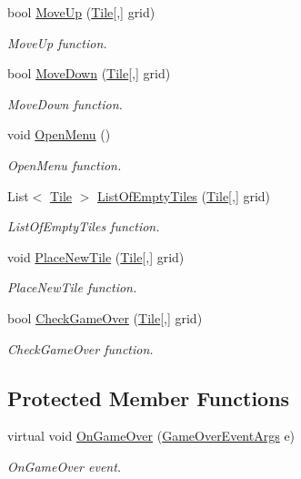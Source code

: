 \begin{DoxyCompactItemize}
bool \mbox{\hyperlink{class_game_1_1_game_logic_af397bfc00de61436b0ec1f5a837bc61c}{Move\+Up}} (\mbox{\hyperlink{class_game_1_1_tile}{Tile}}\mbox{[},\mbox{]} grid)
\begin{DoxyCompactList}\small\item\em Move\+Up function. \end{DoxyCompactList}\item 
bool \mbox{\hyperlink{class_game_1_1_game_logic_ae7032504eaee895fdce17c64490c0a52}{Move\+Down}} (\mbox{\hyperlink{class_game_1_1_tile}{Tile}}\mbox{[},\mbox{]} grid)
\begin{DoxyCompactList}\small\item\em Move\+Down function. \end{DoxyCompactList}\item 
void \mbox{\hyperlink{class_game_1_1_game_logic_a9d04ec4a8a2cc27d098ae6169beb2cf9}{Open\+Menu}} ()
\begin{DoxyCompactList}\small\item\em Open\+Menu function. \end{DoxyCompactList}\item 
List$<$ \mbox{\hyperlink{class_game_1_1_tile}{Tile}} $>$ \mbox{\hyperlink{class_game_1_1_game_logic_a9c5ad5f88426ff3f53252c41611b5ab2}{List\+Of\+Empty\+Tiles}} (\mbox{\hyperlink{class_game_1_1_tile}{Tile}}\mbox{[},\mbox{]} grid)
\begin{DoxyCompactList}\small\item\em List\+Of\+Empty\+Tiles function. \end{DoxyCompactList}\item 
void \mbox{\hyperlink{class_game_1_1_game_logic_af75ecbf1983cfad3a84a6ccbe5c9808f}{Place\+New\+Tile}} (\mbox{\hyperlink{class_game_1_1_tile}{Tile}}\mbox{[},\mbox{]} grid)
\begin{DoxyCompactList}\small\item\em Place\+New\+Tile function. \end{DoxyCompactList}\item 
bool \mbox{\hyperlink{class_game_1_1_game_logic_a11500e039be202e200db57b10afd7261}{Check\+Game\+Over}} (\mbox{\hyperlink{class_game_1_1_tile}{Tile}}\mbox{[},\mbox{]} grid)
\begin{DoxyCompactList}\small\item\em Check\+Game\+Over function. \end{DoxyCompactList}\end{DoxyCompactItemize}
\subsection*{Protected Member Functions}
\begin{DoxyCompactItemize}
\item 
virtual void \mbox{\hyperlink{class_game_1_1_game_logic_a4e30bdba5b9817a7abb6e4509ab63e00}{On\+Game\+Over}} (\mbox{\hyperlink{class_game_1_1_game_over_event_args}{Game\+Over\+Event\+Args}} e)
\begin{DoxyCompactList}\small\item\em On\+Game\+Over event. \end{DoxyCompactList}\end{DoxyCompactItemize}
